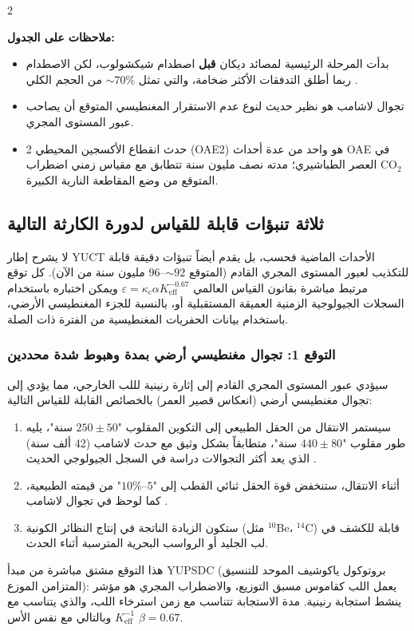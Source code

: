 \documentclass[11pt,a4paper]{article}
\begin{document}
	\begin{multicols}{2}
		
		\noindent
		\textbf{ملاحظات على الجدول:}
		\begin{itemize}
			\item بدأت المرحلة الرئيسية لمصائد ديكان \textbf{قبل} اصطدام شيكشولوب، لكن الاصطدام ربما أطلق التدفقات الأكثر ضخامة، والتي تمثل \(\sim 70\%\) من الحجم الكلي \cite{DeccanTriggering}.
			\item تجوال لاشامب هو نظير حديث لنوع عدم الاستقرار المغنطيسي المتوقع أن يصاحب عبور المستوى المجري.
			\item حدث انقطاع الأكسجين المحيطي 2 (OAE2) هو واحد من عدة أحداث OAE في العصر الطباشيري؛ مدته نصف مليون سنة تتطابق مع مقياس زمني اضطراب CO\(_2\) المتوقع من وضع المقاطعة النارية الكبيرة.
		\end{itemize}
		
		\subsection{ثلاثة تنبؤات قابلة للقياس لدورة الكارثة التالية}
		لا يشرح إطار YUCT الأحداث الماضية فحسب، بل يقدم أيضاً تنبؤات دقيقة قابلة للتكذيب لعبور المستوى المجري القادم (المتوقع \(\sim 92\)–\(96\) مليون سنة من الآن). كل توقع مرتبط مباشرة بقانون القياس العالمي \(\varepsilon = \kappa_c \alpha K_{\mathrm{eff}}^{-0.67}\) ويمكن اختباره باستخدام السجلات الجيولوجية الزمنية العميقة المستقبلية أو، بالنسبة للجزء المغنطيسي الأرضي، باستخدام بيانات الحفريات المغنطيسية من الفترة ذات الصلة.
		
		\subsubsection{التوقع 1: تجوال مغنطيسي أرضي بمدة وهبوط شدة محددين}
		سيؤدي عبور المستوى المجري القادم إلى إثارة رنينية لللب الخارجي، مما يؤدي إلى تجوال مغنطيسي أرضي (انعكاس قصير العمر) بالخصائص القابلة للقياس التالية:
		\begin{enumerate}
			\item سيستمر الانتقال من الحقل الطبيعي إلى التكوين المقلوب "\(250 \pm 50\) سنة"، يليه طور مقلوب "\(440 \pm 80\) سنة"، متطابقاً بشكل وثيق مع حدث لاشامب (42 ألف سنة) الذي يعد أكثر التجوالات دراسة في السجل الجيولوجي الحديث \cite{Laschamp}.
			\item أثناء الانتقال، ستنخفض قوة الحقل ثنائي القطب إلى "\(5\)–\(10\%\)" من قيمته الطبيعية، كما لوحظ في تجوال لاشامب \cite{Laschamp}.
			\item ستكون الزيادة الناتجة في إنتاج النظائر الكونية (مثل \(^{10}\)Be، \(^{14}\)C) قابلة للكشف في لب الجليد أو الرواسب البحرية المترسبة أثناء الحدث.
		\end{enumerate}
		هذا التوقع مشتق مباشرة من مبدأ YUPSDC (بروتوكول ياكوشيف الموحد للتنسيق المتزامن الموزع): يعمل اللب كقاموس مسبق التوزيع، والاضطراب المجري هو مؤشر ينشط استجابة رنينية. مدة الاستجابة تتناسب مع زمن استرخاء اللب، والذي يتناسب مع \(K_{\mathrm{eff}}^{-1}\) وبالتالي مع نفس الأس \(\beta=0.67\).
		

\end{multicols}
\end{document}
